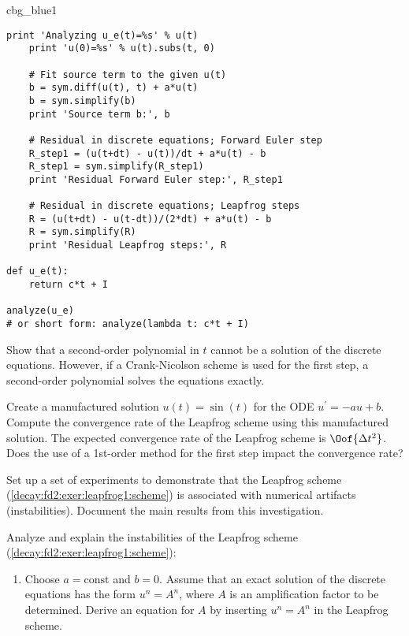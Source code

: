 \documentclass[graybox,sectrefs,envcountresetchap,open=right,final]{svmonodo}
\newenvironment{_cod_tight}[1]{
   \def\FrameCommand{\colorbox{#1}}
   \FrameRule0.6pt\MakeFramed {\FrameRestore}\vskip3mm}
   {\vskip0mm\endMakeFramed}
\newenvironment{cod}[1]{
\bgroup\rmfamily
\fboxsep=0mm\relax
\begin{_cod_tight}{#1}
\list{}{\parsep=-2mm\parskip=0mm\topsep=0pt\leftmargin=2mm
\rightmargin=2\leftmargin\leftmargin=4pt\relax}
\item\relax}
{\endlist\end{_cod_tight}\egroup}
\newenvironment{doconceexercise}{}{}
\begin{document}
\begin{doconceexercise}
\begin{cod}{cbg_blue1}
\begin{Verbatim}[numbers=none,fontsize=\fontsize{9pt}{9pt},baselinestretch=0.95,xleftmargin=2mm]
    print 'Analyzing u_e(t)=%s' % u(t)
    print 'u(0)=%s' % u(t).subs(t, 0)

    # Fit source term to the given u(t)
    b = sym.diff(u(t), t) + a*u(t)
    b = sym.simplify(b)
    print 'Source term b:', b

    # Residual in discrete equations; Forward Euler step
    R_step1 = (u(t+dt) - u(t))/dt + a*u(t) - b
    R_step1 = sym.simplify(R_step1)
    print 'Residual Forward Euler step:', R_step1

    # Residual in discrete equations; Leapfrog steps
    R = (u(t+dt) - u(t-dt))/(2*dt) + a*u(t) - b
    R = sym.simplify(R)
    print 'Residual Leapfrog steps:', R

def u_e(t):
    return c*t + I

analyze(u_e)
# or short form: analyze(lambda t: c*t + I)
\end{Verbatim}
\end{cod}
\noindent


Show that a second-order polynomial in $t$ cannot be a solution of the discrete
equations. However, if a Crank-Nicolson scheme is used for the first
step, a second-order polynomial solves the equations exactly.


Create a manufactured solution $u(t)=\sin(t)$ for the ODE
$u^{\prime}=-au+b$.
Compute the convergence rate of the Leapfrog scheme using this
manufactured solution. The expected convergence rate of the
Leapfrog scheme is $\Oof{\Delta t^2}$. Does the use of a
1st-order method for the first step impact the convergence rate?


Set up a set of experiments to demonstrate that the Leapfrog scheme
(\ref{decay:fd2:exer:leapfrog1:scheme}) is associated with numerical artifacts
(instabilities). Document the main results from this investigation.

Analyze and explain the
instabilities of the Leapfrog scheme (\ref{decay:fd2:exer:leapfrog1:scheme}):

\begin{enumerate}
\item Choose $a=\mbox{const}$ and $b=0$. Assume that an exact solution
   of the discrete equations has
   the form $u^n=A^n$, where $A$ is an amplification factor to
   be determined. Derive an equation for $A$ by inserting $u^n=A^n$
   in the Leapfrog scheme.


\end{enumerate}
\end{doconceexercise}
\end{document}
